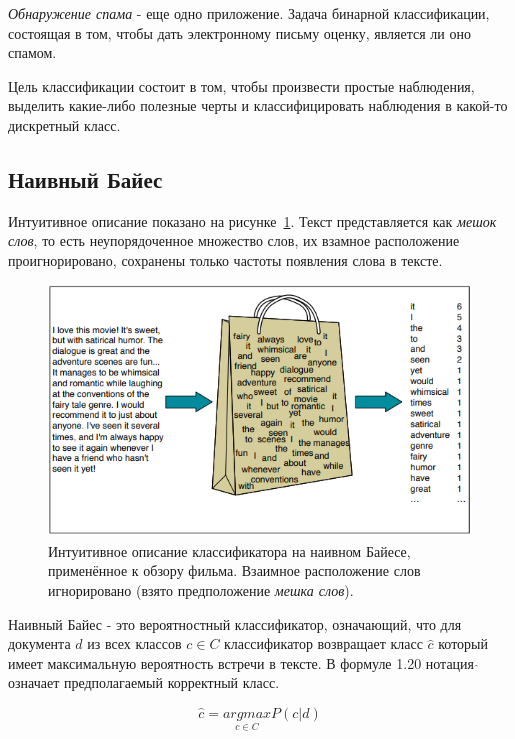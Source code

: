 \documentclass[a4paper,12pt,preview]{report} %
\begin{document}
	 \textit{Обнаружение спама} - еще одно приложение. Задача бинарной классификации, состоящая в том, чтобы дать электронному письму оценку, является ли оно спамом.
	 
	 Цель классификации состоит в том, чтобы произвести простые наблюдения, выделить какие-либо полезные черты и классифицировать наблюдения в какой-то дискретный класс.
	 
	 \subsection{Наивный Байес}
	 
	 Интуитивное описание показано на рисунке~\ref{fig:NaiveBayes}. Текст представляется как \textit{мешок слов}, то есть неупорядоченное множество слов, их взамное расположение проигнорировано, сохранены только частоты появления слова в тексте.
	 
	 
	 \begin{figure}[H]
	 	\centering\includegraphics[scale=0.9]{NaiveBayes.PNG}
	 	\caption{Интуитивное описание классификатора на наивном Байесе, применённое к обзору фильма. Взаимное расположение слов игнорировано (взято предположение \textit{мешка слов}).}
	 	\label{fig:NaiveBayes}
	 \end{figure}
	  
	  Наивный Байес - это вероятностный классификатор, означающий, что для документа $d$ из всех классов $c \in C$ классификатор возвращает класс $\hat{c}$ который имеет максимальную вероятность встречи в тексте. В формуле 1.20 нотация $\hat{}$ означает предполагаемый корректный класс. 
	
	\begin{equation}
		\hat{c} = \underset{c \in C}{argmax} P(c | d)
	\end{equation}
	
\end{document}

